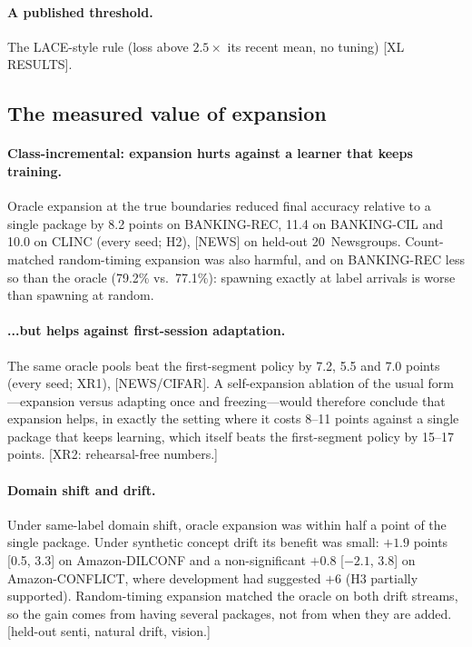 \documentclass[10pt]{article}
\begin{document}
\paragraph{A published threshold.} The LACE-style rule (loss above $2.5\times$ its recent mean, no tuning) [XL RESULTS].

\subsection{The measured value of expansion}
\label{sec:res-value}
\paragraph{Class-incremental: expansion hurts against a learner that keeps training.} Oracle expansion at the true boundaries reduced final accuracy relative to a single package by 8.2 points on BANKING-REC, 11.4 on BANKING-CIL and 10.0 on CLINC (every seed; H2), [NEWS] on held-out 20~Newsgroups. Count-matched random-timing expansion was also harmful, and on BANKING-REC less so than the oracle (79.2\% vs.\ 77.1\%): spawning exactly at label arrivals is worse than spawning at random.

\paragraph{...but helps against first-session adaptation.} The same oracle pools beat the first-segment policy by 7.2, 5.5 and 7.0 points (every seed; XR1), [NEWS/CIFAR]. A self-expansion ablation of the usual form---expansion versus adapting once and freezing---would therefore conclude that expansion helps, in exactly the setting where it costs 8--11 points against a single package that keeps learning, which itself beats the first-segment policy by 15--17 points. [XR2: rehearsal-free numbers.]

\paragraph{Domain shift and drift.} Under same-label domain shift, oracle expansion was within half a point of the single package. Under synthetic concept drift its benefit was small: $+1.9$ points [0.5, 3.3] on Amazon-DILCONF and a non-significant $+0.8$ [$-2.1$, 3.8] on Amazon-CONFLICT, where development had suggested $+6$ (H3 partially supported). Random-timing expansion matched the oracle on both drift streams, so the gain comes from having several packages, not from when they are added. [held-out senti, natural drift, vision.]
\end{document}
